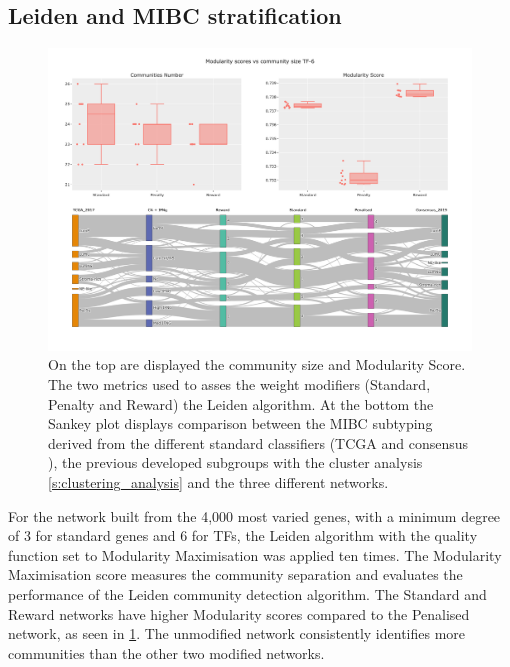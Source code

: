 \subsection{Leiden and MIBC stratification} \label{s:N_I:tum_stratification}

\begin{figure}[!htb]    
    \centering
    \includegraphics[width=1.0\textwidth,keepaspectratio]{Sections/Network_I/Resources/Tum_network/LeidenMetrics_Sankey_TF-6.png}
    \caption{On the top are displayed the community size and Modularity Score. The two metrics used to asses the weight modifiers (Standard, Penalty and Reward) the Leiden algorithm. At the bottom the Sankey plot displays comparison between the MIBC subtyping derived from the different standard classifiers (TCGA \citep{Robertson2017-mg} and consensus \citep{Kamoun2020-tj}), the previous developed subgroups with the cluster analysis \cref{s:clustering_analysis} and the three different networks. }
    \label{fig:N_I:tum_leiden_modifiers}
\end{figure}


For the network built from the 4,000 most varied genes, with a minimum degree of 3 for standard genes and 6 for TFs, the Leiden algorithm with the quality function set to Modularity Maximisation was applied ten times. The Modularity Maximisation score measures the community separation and evaluates the performance of the Leiden community detection algorithm. The Standard and Reward networks have higher Modularity scores compared to the Penalised network, as seen in \cref{fig:N_I:tum_leiden_modifiers}. The unmodified network consistently identifies more communities than the other two modified networks.

